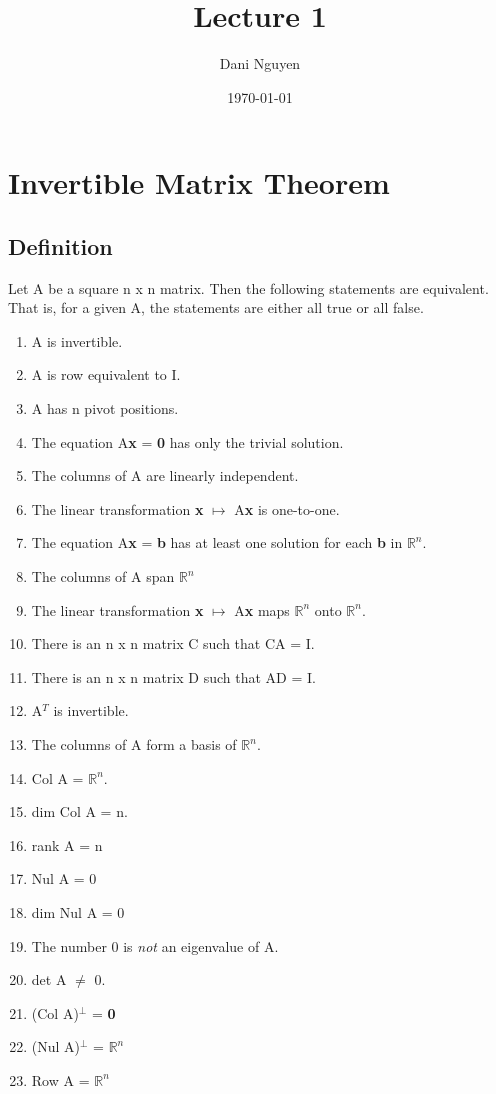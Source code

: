 \documentclass[12pt, letterpaper]{article}
\title{Lecture 1}
\author{Dani Nguyen}
\date{\today}
\begin{document}
\maketitle

\section{Invertible Matrix Theorem}
\subsection{Definition}
Let A be a square n x n matrix. Then the following statements are
equivalent. That is, for a given A, the statements are either all 
true or all false.
\begin{enumerate}
    \item A is invertible.
    \item A is row equivalent to I.
    \item A has n pivot positions.
    \item The equation A\textbf{x} = \textbf{0} has only the trivial solution.
    \item The columns of A are linearly independent.
    \item The linear transformation \textbf{x} $\mapsto$ A\textbf{x} is one-to-one.
    \item The equation A\textbf{x} = \textbf{b} has at least one solution for each \textbf{b} in $\mathbb{R}^n$.
    \item The columns of A span $\mathbb{R}^n$
    \item The linear transformation \textbf{x} $\mapsto$ A\textbf{x} maps $\mathbb{R}^n$ onto $\mathbb{R}^n$.
    \item There is an n x n matrix C such that CA = I.
    \item There is an n x n matrix D such that AD = I.
    \item A$^T$ is invertible.
    \item The columns of A form a basis of $\mathbb{R}^n$.
    \item Col A = $\mathbb{R}^n$.
    \item dim Col A = n.
    \item rank A = n
    \item Nul A = {0}
    \item dim Nul A = 0
    \item The number 0 is \emph{not} an eigenvalue of A.
    \item det A $\neq$ 0.
    \item (Col A)$^\bot$ = \textbf{0}
    \item (Nul A)$^\bot$ = $\mathbb{R}^n$
    \item Row A = $\mathbb{R}^n$
\end{enumerate}
\end{document}
